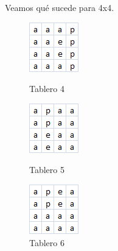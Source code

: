 Veamos qué sucede para 4x4.


\begin{figure}[!htb]
  \includegraphics[scale=1]{imagenes/tab4.png}
  \caption{Tablero 4}\label{fig:tab4}
\endminipage\hfill
{}
  \includegraphics[scale=1]{imagenes/tab5.png}
  \caption{Tablero 5}\label{fig:tab5}
\endminipage\hfill
{}%
  \includegraphics[scale=1]{imagenes/tab6.png}
  \caption{Tablero 6}\label{fig:tab6}
\endminipage
\end{figure}




